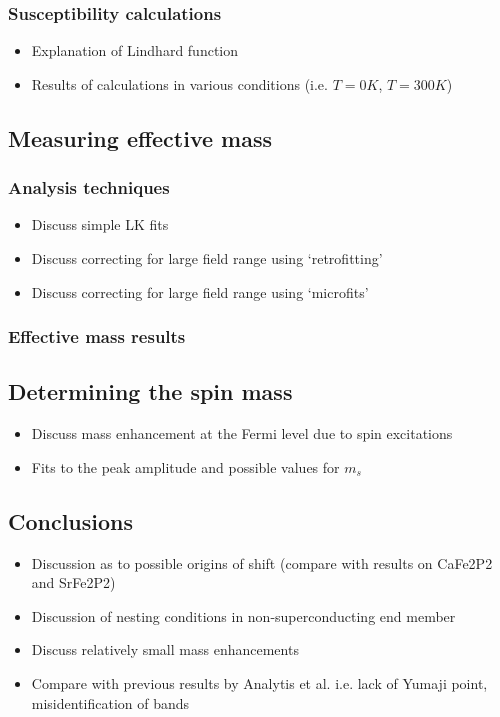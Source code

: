 \documentclass[11pt, a4paper]{article}
\begin{document}
        \subsubsection{Susceptibility calculations}
            \begin{itemize}
                \item Explanation of Lindhard function
                \item Results of calculations in various conditions (i.e. $T=0\unit{K}$, $T=300\unit{K}$)
            \end{itemize}    

    \subsection{Measuring effective mass}
        \subsubsection{Analysis techniques}
            \begin{itemize}
                \item Discuss simple LK fits
                \item Discuss correcting for large field range using `retrofitting'
                \item Discuss correcting for large field range using `microfits'
            \end{itemize}
        \subsubsection{Effective mass results}

    \subsection{Determining the spin mass}
        \begin{itemize}
            \item Discuss mass enhancement at the Fermi level due to spin excitations
            \item Fits to the peak amplitude and possible values for $m_{s}$
        \end{itemize}
            

    \subsection{Conclusions}
        \begin{itemize}
            \item Discussion as to possible origins of shift (compare with results on CaFe2P2 and SrFe2P2)
            \item Discussion of nesting conditions in non-superconducting end member
            \item Discuss relatively small mass enhancements
            \item Compare with previous results by Analytis et al. i.e. lack of Yumaji point, misidentification of bands        
        \end{itemize}
\end{document}
